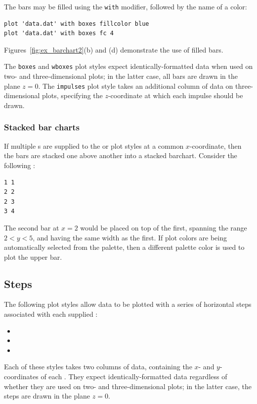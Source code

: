 The bars may be filled using the {\tt with}  modifier,
followed by the name of a color:

\begin{verbatim}
plot 'data.dat' with boxes fillcolor blue
plot 'data.dat' with boxes fc 4
\end{verbatim}

\noindent Figures~\ref{fig:ex_barchart2}(b) and (d) demonstrate the use of
filled bars.

The {\tt boxes} and {\tt wboxes} plot styles expect identically-formatted data
when used on two- and three-dimensional plots; in the latter case, all bars are
drawn in the plane $z=0$. The {\tt impulses} plot style takes an additional
column of data on three-dimensional plots, specifying the $z$-coordinate at
which each impulse should be drawn.

\subsubsection{Stacked bar charts}

If multiple \datapoint s are supplied to the  or 
plot styles at a common $x$-coordinate, then the bars are stacked one above
another into a stacked barchart. Consider the following \datafile:

\begin{verbatim}
1 1
2 2
2 3
3 4
\end{verbatim}

\noindent The second bar at $x=2$ would be placed on top of the first, spanning
the range $2<y<5$, and having the same width as the first. If plot colors are
being automatically selected from the palette, then a different palette color
is used to plot the upper bar.

\subsection{Steps}

The following plot styles allow data to be plotted with a series of horizontal
steps associated with each supplied \datapoint:
\begin{itemize}
\item {}
\item {}
\item {}
\end{itemize}
Each of these styles takes two columns of data, containing the $x$- and
$y$-coordinates of each \datapoint.  They expect identically-formatted data
regardless of whether they are used on two- and three-dimensional plots; in the
latter case, the steps are drawn in the plane $z=0$.

